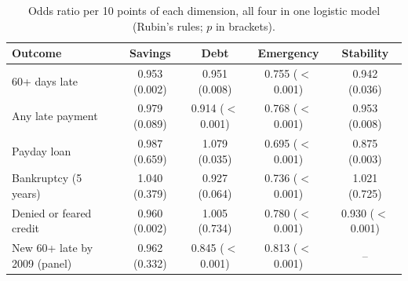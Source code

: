 \begin{table}[htbp]
\centering
\small
\caption{Odds ratio per 10 points of each dimension, all four in one logistic model (Rubin's rules; $p$ in brackets).}
\label{tab:dims}
\begin{tabular}{lcccc}
\toprule
Outcome & Savings & Debt & Emergency & Stability \\
\midrule
60+ days late & 0.953 (0.002) & 0.951 (0.008) & 0.755 ($<$0.001) & 0.942 (0.036) \\
Any late payment & 0.979 (0.089) & 0.914 ($<$0.001) & 0.768 ($<$0.001) & 0.953 (0.008) \\
Payday loan & 0.987 (0.659) & 1.079 (0.035) & 0.695 ($<$0.001) & 0.875 (0.003) \\
Bankruptcy (5 years) & 1.040 (0.379) & 0.927 (0.064) & 0.736 ($<$0.001) & 1.021 (0.725) \\
Denied or feared credit & 0.960 (0.002) & 1.005 (0.734) & 0.780 ($<$0.001) & 0.930 ($<$0.001) \\
New 60+ late by 2009 (panel) & 0.962 (0.332) & 0.845 ($<$0.001) & 0.813 ($<$0.001) & -- \\
\bottomrule
\end{tabular}
\end{table}
